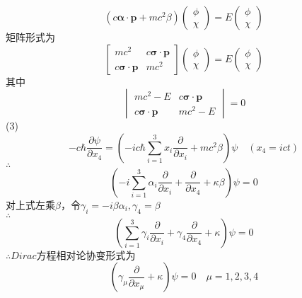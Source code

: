 \documentclass[12pt]{article}
\numberwithin{equation}{section}	 %
\begin{document}
\begin{spacing}{1.5}
\begin{equation}
\left(c\bm{\alpha \cdot p} +mc^{2}\beta\right) \begin{pmatrix} \phi \\ \chi \end{pmatrix} = E\begin{pmatrix} \phi \\ \chi \end{pmatrix}
\end{equation}
矩阵形式为
\begin{equation}
\begin{bmatrix}
mc^{2} & c\bm{\sigma \cdot p} \\
c\bm{\sigma \cdot p} & mc^{2}
\end{bmatrix} \begin{pmatrix} \phi \\ \chi \end{pmatrix} = E\begin{pmatrix} \phi \\ \chi \end{pmatrix}
\end{equation}
其中
\begin{equation}
\begin{vmatrix}
mc^{2}-E & c\bm{\sigma \cdot p} \\
c\bm{\sigma \cdot p} & mc^{2}-E
\end{vmatrix} = 0
\end{equation}
(3) 
\begin{equation}
-c\hbar\frac{\partial\psi}{\partial x_{4}} = \left( -ic\hbar\sum_{i=1}^{3}x_{i}\frac{\partial}{\partial x_{i}} + mc^{2}\beta \right) \psi \quad (x_{4}=ict)
\end{equation}
$\therefore$
\begin{equation}
\left( -i\sum_{i=1}^{3}\alpha_{i}\frac{\partial}{\partial x_{i}} + \frac{\partial}{\partial x_{4}} + \kappa\beta \right) \psi = 0
\end{equation}
对上式左乘$\beta$，令$\gamma_{i}=-i\beta\alpha_{i},\gamma_{4}=\beta$\\
$\therefore$
\begin{equation}
\left( \sum_{i=1}^{3}\gamma_{i}\frac{\partial}{\partial x_{i}} + \gamma_{4}\frac{\partial}{\partial x_{4}} + \kappa \right) \psi = 0
\end{equation}
$\therefore  Dirac$方程相对论协变形式为
\begin{equation}
\left( \gamma_{\mu}\frac{\partial}{\partial x_{\mu}} + \kappa \right) \psi = 0 \quad \mu=1,2,3,4
\end{equation}
~\\

\end{spacing}
\end{document}
